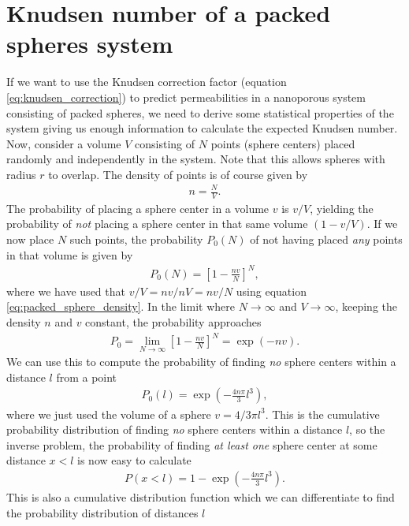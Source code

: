\chapter{Knudsen number of a packed spheres system}
\label{app:knudsen_number_packed_spheres}
If we want to use the Knudsen correction factor (equation \eqref{eq:knudsen_correction}) to predict permeabilities in a nanoporous system consisting of packed spheres, we need to derive some statistical properties of the system giving us enough information to calculate the expected Knudsen number. Now, consider a volume $V$ consisting of $N$ points (sphere centers) placed randomly and independently in the system. Note that this allows spheres with radius $r$ to overlap. The density of points is of course given by
\begin{align}
	\label{eq:packed_sphere_density}
	n = \frac{N}{V}.
\end{align}
The probability of placing a sphere center in a volume $v$ is $v/V$, yielding the probability of \textit{not} placing a sphere center in that same volume $(1 - v/V)$. If we now place $N$ such points, the probability $P_0(N)$ of not having placed \textit{any} points in that volume is given by
\begin{align}
	P_0(N) = \left[1 - \frac{nv}{N}\right]^N,
\end{align}
where we have used that $v/V = nv/nV = nv/N$ using equation \eqref{eq:packed_sphere_density}. In the limit where $N\rightarrow\infty$ and $V\rightarrow\infty$, keeping the density $n$ and $v$ constant, the probability approaches
\begin{align}
	P_0 = \lim_{N\rightarrow\infty}\left[1 - \frac{nv}{N}\right]^N = \exp(-nv).
\end{align}
We can use this to compute the probability of finding \textit{no} sphere centers within a distance $l$ from a point
\begin{align}
	\label{eq:packed_sphere_p0}
	P_0(l) = \exp\left(-\frac{4n\pi}{3}l^3\right),
\end{align}
where we just used the volume of a sphere $v=4/3\pi l^3$. This is the cumulative probability distribution of finding \textit{no} sphere centers within a distance $l$, so the inverse problem, the probability of finding \textit{at least one} sphere center at some distance $x<l$ is now easy to calculate 
\begin{align}
	P(x<l) = 1 - \exp\left(-\frac{4n\pi}{3}l^3\right).
\end{align}
This is also a cumulative distribution function which we can differentiate to find the probability distribution of distances $l$
